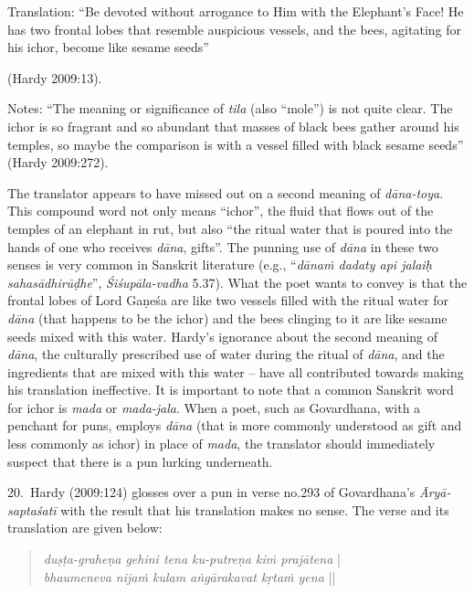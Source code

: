 \begin{myquote}
Translation: “Be devoted without arrogance to Him with the Elephant’s Face! He has two frontal lobes that resemble auspicious vessels, and the bees, agitating for his ichor, become like sesame seeds” 

\hfill(Hardy 2009:13).
\end{myquote}

Notes: “The meaning or significance of \textsl{tila} (also “mole”) is not quite clear. The ichor is so fragrant and so abundant that masses of black bees gather around his temples, so maybe the comparison is with a vessel filled with black sesame seeds” (Hardy 2009:272).

The translator appears to have missed out on a second meaning of \textsl{dāna-toya}. This compound word not only means “ichor”, the fluid that flows out of the temples of an elephant in rut, but also “the ritual water that is poured into the hands of one who receives \textsl{dāna}, gifts”. The punning use of \textsl{dāna} in these two senses is very common in Sanskrit literature (e.g., “\textsl{dānaṁ dadaty api jalaiḥ sahasādhirūḍhe}”, \textsl{Śiśupāla-vadha} 5.37). What the poet wants to convey is that the frontal lobes of Lord Gaṇeśa are like two vessels filled with the ritual water for \textsl{dāna} (that happens to be the ichor) and the bees clinging to it are like sesame seeds mixed with this water. Hardy’s ignorance about the second meaning of \textsl{dāna}, the culturally prescribed use of water during the ritual of \textsl{dāna}, and the ingredients that are mixed with this water -- have all contributed towards making his translation ineffective. It is important to note that a common Sanskrit word for ichor is \textsl{mada} or \textsl{mada-jala}. When a poet, such as Govardhana, with a penchant for puns, employs \textsl{dāna} (that is more commonly understood as gift and less commonly as ichor) in place of \textsl{mada}, the translator should immediately suspect that there is a pun lurking underneath. 

20.~Hardy (2009:124) glosses over a pun in verse no.\@ 293 of Govardhana’s \textsl{Āryā-saptaśatī} with the result that his translation makes no sense. The verse and its translation are given below:
\begin{quote}
\textsl{duṣṭa-graheṇa gehini tena ku-putreṇa kiṁ prajātena} |\\
\textsl{bhaumeneva nijaṁ kulam aṅgārakavat kṛtaṁ yena} ||
\end{quote}

